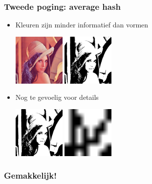 \documentclass{beamer}
\begin{document}

\begin{frame}
  \frametitle{Tweede poging: average hash}

  \begin{itemize}
    \pause \item Kleuren zijn minder informatief dan vormen

    \pause

    \begin{center}
      \includegraphics[height=1in]{../target.png}
      \raisebox{.48in}{$\Longrightarrow$}
      \includegraphics[height=1in]{bw.png}
    \end{center}

    \pause \item Nog te gevoelig voor details

    \pause

    \begin{center}
      \includegraphics[height=1in]{bw.png}
      \raisebox{.48in}{$\Longrightarrow$}
      \includegraphics[height=1in]{bw_small.png}
    \end{center}
  \end{itemize}
\end{frame}

\begin{frame}[fragile]
  \frametitle{Gemakkelijk!}

  

  \pause

  

\end{frame}
\end{document}
